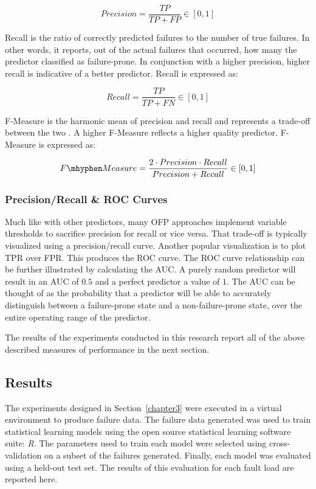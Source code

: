 \[ Precision 
	= \dfrac{TP}{TP + FP} \in [0,1]
\]

Recall is the ratio of correctly predicted failures to the number of true
failures.  In other words, it reports, out of the actual failures that
occurred, how many the predictor classified as failure-prone.  In conjunction
with a higher precision, higher recall is indicative of a better predictor.
Recall is expressed as:

\[ Recall 
	= \dfrac{TP}{TP + FN} \in [0,1]
\]

F-Measure is the harmonic mean of precision and recall and represents a
trade-off between the two \citep{rijsbergen1979v}.  A higher F-Measure reflects
a higher quality predictor.  F-Measure is expressed as:

\[ F\mhyphen Measure 
	= \dfrac{2 \cdot Precision \cdot Recall}{Precision + Recall} \in [0,1]
\]

\subsubsection{Precision/Recall \& \ac{ROC} Curves}
Much like with other predictors, many \ac{OFP} approaches implement variable
thresholds to sacrifice precision for recall or vice versa.  That trade-off is
typically visualized using a precision/recall curve.  Another popular
visualization is to plot \ac{TPR} over \ac{FPR}.  This produces the \ac{ROC}
curve.  The \ac{ROC} curve relationship can be further illustrated by
calculating the \ac{AUC}.  A purely random predictor will result in an \ac{AUC}
of $0.5$ and a perfect predictor a value of $1$.  The \ac{AUC} can be thought
of as the probability that a predictor will be able to accurately distinguish
between a failure-prone state and a non-failure-prone state, over the entire
operating range of the predictor.

The results of the experiments conducted in this research report all of the
above described measures of performance in the next section.

\subsection{Results} \label{results}
The experiments designed in Section~\ref{chapter3} were executed in a virtual
environment to produce failure data.  The failure data generated was used to
train statistical learning models using the open source statistical learning
software suite: \emph{R}.  The parameters used to train each model were
selected using cross-validation on a subset of the failures generated.
Finally, each model was evaluated using a held-out test set.  The results of
this evaluation for each fault load are reported here.

